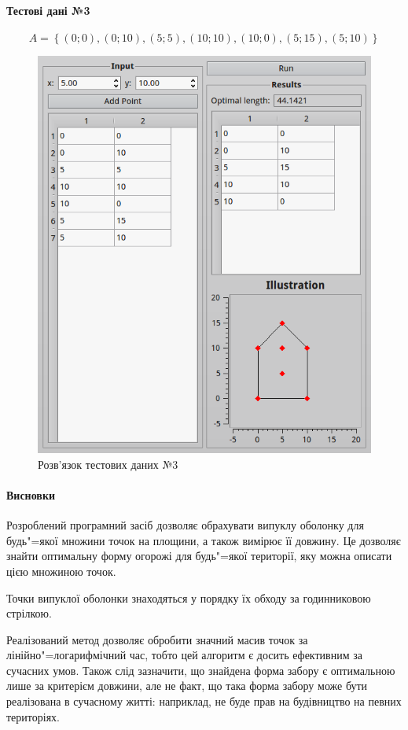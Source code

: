 \documentclass[a4paper,12pt,notitlepage,pdftex]{scrartcl}
\begin{document}
\paragraph{Тестові дані №3}
\begin{equation}
  A = \left\{ \left( 0; 0 \right), \left( 0; 10 \right), \left( 5; 5
  \right), \left( 10; 10 \right), \left( 10; 0 \right), \left( 5; 15
\right), \left( 5; 10 \right) \right\}
  \label{eq:t3}
\end{equation}
\begin{figure}[h!]
  \centering
  \includegraphics[scale=0.65]{scr3.png}
  \caption{Розв’язок тестових даних №3}
  \label{fig:f3}
\end{figure}

\paragraph{Висновки}
  Розроблений програмний засіб дозволяє обрахувати випуклу оболонку для
  будь"=якої множини точок на площини, а також вимірює її довжину.
  Це дозволяє знайти оптимальну форму огорожі для будь"=якої території, яку
  можна описати цією множиною точок.

  Точки випуклої оболонки знаходяться у порядку їх обходу за годинниковою
  стрілкою.

  Реалізований метод дозволяє обробити значний масив точок за
  лінійно"=логарифмічний час, тобто цей алгоритм є досить ефективним за
  сучасних умов.
  Також слід зазначити, що знайдена форма забору є оптимальною лише за
  критерієм довжини, але не факт, що така форма забору може бути реалізована в
  сучасному житті: наприклад, не буде прав на будівництво на певних
  територіях.
\end{document}
